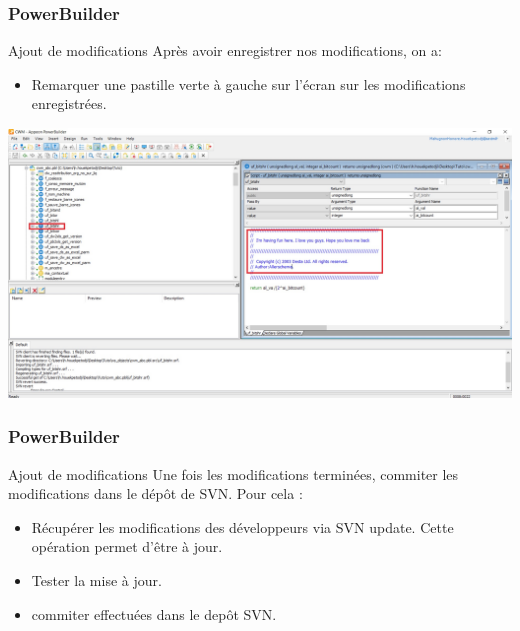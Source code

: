 \documentclass{beamer}
\begin{document}
\begin{frame}
\frametitle{PowerBuilder}
\begin{block}{Ajout de modifications}
Après avoir enregistrer nos modifications, on a:
\begin{itemize}
\item Remarquer une pastille verte  à gauche sur l'écran  sur les modifications enregistrées.
\end{itemize}
\end{block}
 
\includegraphics[scale=.2]{../images/modif2.jpg}
\end{frame}

\begin{frame}
\frametitle{PowerBuilder}
\begin{block}{Ajout de modifications}
Une fois les modifications terminées, commiter les modifications dans le dépôt de SVN.  Pour cela :
\begin{itemize}
\item Récupérer les modifications des développeurs via \alert{SVN update}. Cette opération permet d'être à jour. 
\item Tester la mise à jour.
\item commiter effectuées dans le depôt SVN.
\end{itemize} 
\end{block}
\end{frame}
\end{document}
